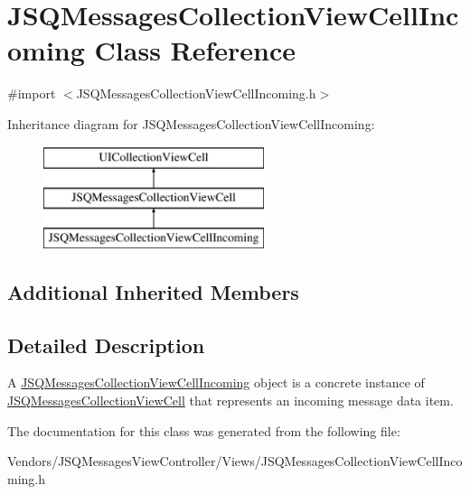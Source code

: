 \hypertarget{interface_j_s_q_messages_collection_view_cell_incoming}{}\section{J\+S\+Q\+Messages\+Collection\+View\+Cell\+Incoming Class Reference}
\label{interface_j_s_q_messages_collection_view_cell_incoming}


{\ttfamily \#import $<$J\+S\+Q\+Messages\+Collection\+View\+Cell\+Incoming.\+h$>$}

Inheritance diagram for J\+S\+Q\+Messages\+Collection\+View\+Cell\+Incoming\+:\begin{figure}[H]
\begin{center}
\leavevmode
\includegraphics[height=3.000000cm]{interface_j_s_q_messages_collection_view_cell_incoming}
\end{center}
\end{figure}
\subsection*{Additional Inherited Members}


\subsection{Detailed Description}
A {\ttfamily \hyperlink{interface_j_s_q_messages_collection_view_cell_incoming}{J\+S\+Q\+Messages\+Collection\+View\+Cell\+Incoming}} object is a concrete instance of {\ttfamily \hyperlink{interface_j_s_q_messages_collection_view_cell}{J\+S\+Q\+Messages\+Collection\+View\+Cell}} that represents an incoming message data item. 

The documentation for this class was generated from the following file\+:\begin{DoxyCompactItemize}
\item 
Vendors/\+J\+S\+Q\+Messages\+View\+Controller/\+Views/J\+S\+Q\+Messages\+Collection\+View\+Cell\+Incoming.\+h\end{DoxyCompactItemize}
